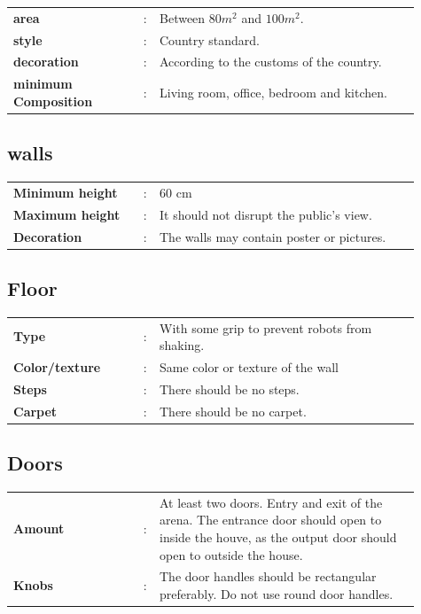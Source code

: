 \documentclass[11pt, twoside, openright, a4paper, chapterprefix]{article}
\begin{document}
\begin{tabular}{ p{0.3\linewidth} p{0.01\linewidth} p{0.6\linewidth}}
    \textbf{area}                 & : & Between $80m^2$ and $100m^2$. \\
    \textbf{style}                & : & Country standard. \\
    \textbf{decoration}           & : & According to the customs of the country. \\
    \textbf{minimum Composition}  & : & Living room, office, bedroom and kitchen.
\end{tabular}


\subsection{walls}

\begin{tabular}{ p{0.3\linewidth} p{0.01\linewidth} p{0.6\linewidth}}
    \textbf{Minimum height}       & : & 60 cm \\
    \textbf{Maximum height}       & : & It should not disrupt the public's view. \\
    \textbf{Decoration}           & : & The walls may contain poster or pictures. 
\end{tabular}

\subsection{Floor}

\begin{tabular}{ p{0.3\linewidth} p{0.01\linewidth} p{0.6\linewidth}}
    \textbf{Type}                 & : & With some grip to prevent robots from shaking. \\
    \textbf{Color/texture}        & : & Same color or texture of the wall \\
    \textbf{Steps}                & : & There should be no steps. \\
    \textbf{Carpet}               & : & There should be no carpet. 
\end{tabular}

\subsection{Doors}

\begin{tabular}{ p{0.3\linewidth} p{0.01\linewidth} p{0.6\linewidth}}
    \textbf{Amount}           & : & At least two doors. Entry and exit of the arena. The entrance door should open to inside the houve, as the output door should open to outside the house. \\
    \textbf{Knobs}            & : & The door handles should be rectangular preferably. Do not use round door handles. 
\end{tabular}
\end{document}

